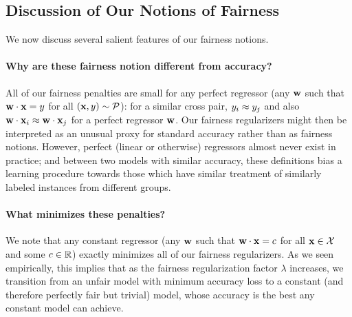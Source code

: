 
\subsection{Discussion of Our Notions of Fairness}

We now discuss several salient features of our fairness notions.

\paragraph{Why are these fairness notion different from accuracy?}
All of our fairness penalties are small for any perfect regressor (any
$\mathbf{w}$ such that $\mathbf{w} \cdot \mathbf{x} = y$ for all $(\mathbf{x},y)\sim\mathcal{P}$): for a
similar cross pair, $y_{i} \approx y_{j}$ and also
$\mathbf{w} \cdot {\bf x}_{i} \approx \mathbf{w} \cdot {\bf x}_{j}$ for a perfect regressor $\mathbf{w}$.
Our fairness regularizers might then be interpreted as an unusual
proxy for standard accuracy rather than as fairness notions.  However,
perfect (linear or otherwise) regressors almost never exist in
practice; and between two models with similar accuracy, these
definitions bias a learning procedure towards those which have similar
treatment of similarly labeled instances from different groups.

\paragraph{What minimizes these penalties?}
We note that any constant regressor (any $\mathbf{w}$ such that
$\mathbf{w} \cdot \mathbf{x} = c $ for all $\mathbf{x}\in\mathcal{X}$ and some $c\in \mathbb{R}$) exactly
minimizes all of our fairness regularizers.  As we seen empirically,
this implies that as the fairness regularization factor $\lambda$
increases, we transition from an unfair model with minimum accuracy
loss to a constant (and therefore perfectly fair but trivial) model,
whose accuracy is the best any constant model can achieve.



%
%
%  

